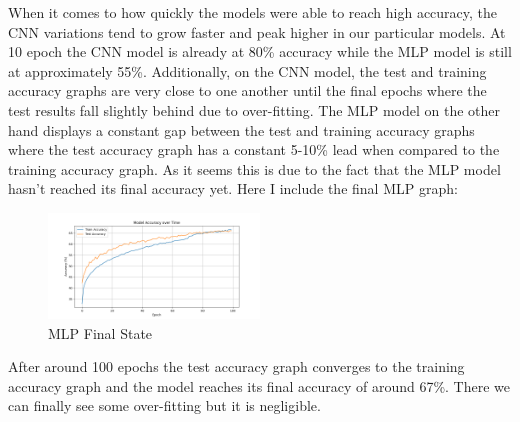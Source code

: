When it comes to how quickly the models were able to reach high accuracy, the CNN variations
tend to grow faster and peak higher in our particular models. At 10 epoch the CNN model is 
already at 80\% accuracy while the MLP model is still at approximately 55\%. Additionally,
on the CNN model, the test and training accuracy graphs are very close to one another until
the final epochs where the test results fall slightly behind due to over-fitting. The MLP model
on the other hand displays a constant gap between the test and training accuracy graphs where 
the test accuracy graph has a constant 5-10\% lead when compared to the training accuracy graph.
As it seems this is due to the fact that the MLP model hasn't reached its final accuracy yet. 
Here I include the final MLP graph:
\begin{figure}[H]
    \centering
    \includegraphics[width=0.5\textwidth]{media/mlp_final_state.png}
    \caption{MLP Final State}
\end{figure}
After around 100 epochs the test accuracy graph converges to the training accuracy graph and the
model reaches its final accuracy of around 67\%. There we can finally see some over-fitting but it
is negligible.

